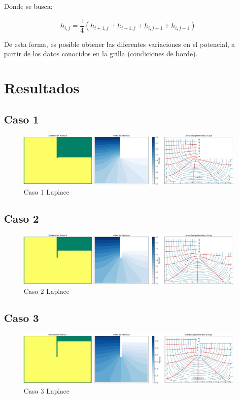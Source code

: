 Donde se busca:

\begin{equation}
    h_{i,j} = \frac{1}{4}(h_{i+1,j} + h_{i-1,j} + h_{i,j+1} + h_{i,j-1})
\end{equation}

De esta forma, es posible obtener las diferentes variaciones en el potencial, a partir de los datos conocidos en la grilla (condiciones de borde).

\section{Resultados}

\subsection{Caso 1}

\begin{figure}[H]
    \centering
    \includegraphics[width=\textwidth]{GRAFICOS/laplace_caso_1.jpg}
    \caption{Caso 1 Laplace}
\end{figure}

\subsection{Caso 2}

\begin{figure}[H]
    \centering
    \includegraphics[width=\textwidth]{GRAFICOS/laplace_caso_2.jpg}
    \caption{Caso 2 Laplace}
\end{figure}

\subsection{Caso 3}

\begin{figure}[H]
    \centering
    \includegraphics[width=\textwidth]{GRAFICOS/laplace_caso_3.jpg}
    \caption{Caso 3 Laplace}
\end{figure}
   